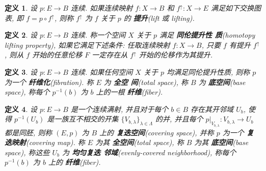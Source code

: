 \documentclass{ctexart}
\newtheorem*{defn}{定义}
\begin{document}
\begin{defn}
设 $p : E \to B$ 连续. 如果连续映射 $f : X \to B$ 和 $f^\uparrow : X
\to E$ 满足如下交换图表, 即 $f = p \circ f^\uparrow$, 则称
$f^\uparrow$ 为 $f$ 关于 $p$ 的 \textbf{提升}(lift 或 lifting).
\begin{center}
\end{center}
\end{defn}

\begin{defn}
设 $p : E \to B$ 连续. 称一个空间 $X$ 关于 $p$ 满足 \textbf{同伦提升性
  质}(homotopy lifting property), 如果它满足下述条件: 任取连续映射 $f
: X \to B$, 只要 $f$ 有提升 $f^\uparrow$, 则从 $f$ 开始的任意伦移 $F$
一定存在从 $f^\uparrow$ 开始的伦移作为其提升.
\end{defn}
\begin{center}
\end{center}

\begin{defn}
设 $p : E \to B$ 连续. 如果任何空间 $X$ 关于 $p$ 均满足同伦提升性质,
则称 $p$ 为一个 \textbf{纤维化}(fibration). 称 $E$ 为 \textbf{全空
  间}(total space), 称 $B$ 为 \textbf{底空间}(base space), 称每个
$p^{-1}(b)$ 为 $b$ 上的一根 \textbf{纤维}(fiber).
\end{defn}

\begin{defn}
设 $p : E \to B$ 是一个连续满射, 并且对于每个 $b \in B$ 存在其开邻域
$U_b$, 使得 $p^{-1}(U_b)$ 是一族互不相交的开集
$\{V_{b,\lambda}\}_{\lambda \in \Lambda}$ 的并, 并且每个
$p|_{V_{b,\lambda}} : V_{b,\lambda} \to U_b$ 都是同胚, 则称 $(E,p)$ 为
$B$ 上的 \textbf{复迭空间}(covering space), 并称 $p$ 为一个 \textbf{复
  迭映射}(covering map). 称 $E$ 为其 \textbf{全空间}(total space), 称
$B$ 为其 \textbf{底空间}(base space), 称这些 $U_b$ 为 \textbf{均匀复迭
  邻域}(evenly-covered neighborhood), 称每个 $p^{-1}(b)$ 为 $b$ 上的
\textbf{纤维}(fiber).
\end{defn}
\end{document}
